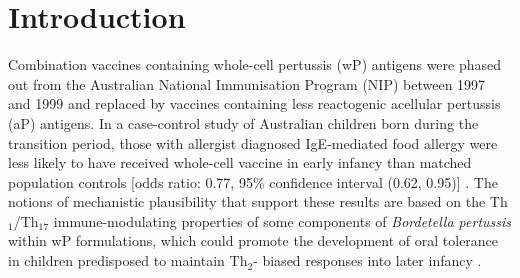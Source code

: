 \documentclass{bmcart}
\begin{document}
\begin{frontmatter}
\begin{abstractbox}

\end{abstractbox}
%

\end{frontmatter}



\section*{Introduction}

Combination vaccines containing whole-cell pertussis (wP) antigens were phased out from the Australian National Immunisation Program (NIP) between 1997 and 1999 and replaced by vaccines containing less reactogenic acellular pertussis (aP) antigens.
In a case-control study of Australian children born during the transition period, those with allergist diagnosed IgE-mediated food allergy were less likely to have received whole-cell vaccine in early infancy than matched population controls [odds ratio: 0.77, 95\% confidence interval (0.62, 0.95)] \cite{estcourt2020whole}.
The notions of mechanistic plausibility that support these results are based on the Th$_1$/Th$_{17}$ immune-modulating properties of some components of \textit{Bordetella pertussis} within wP formulations, which could promote the development of oral tolerance in children predisposed to maintain Th$_2$- biased responses into later infancy \cite{perez2020}.
\end{document}

